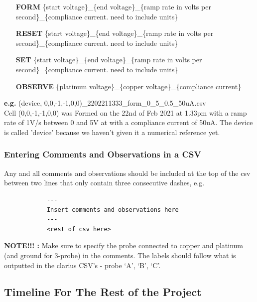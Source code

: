 \documentclass{article}
\begin{document}
          \begin{itemize}
            \item [\textbf{FORM}] \{start voltage\}\_\{end voltage\}\_\{ramp rate in volts per second\}\_\{compliance
              current. need to include units\}
            \item [\textbf{RESET}] \{start voltage\}\_\{end voltage\}\_\{ramp rate in volts per second\}\_\{compliance
              current. need to include units\}
            \item [\textbf{SET}] \{start voltage\}\_\{end voltage\}\_\{ramp rate in volts per second\}\_\{compliance
              current. need to include units\}
            \item [\textbf{OBSERVE}] \{platinum voltage\}\_\{copper voltage\}\_\{compliance current\}
          \end{itemize}

          \textbf{e.g.} (device, 0,0,-1,-1,0,0)\_2202211333\_form\_0\_5\_0.5\_50uA.csv \\ Cell (0,0,-1,-1,0,0) was
          Formed on the 22nd of Feb 2021 at 1.33pm with a ramp rate of 1V/s between 0 and 5V at with a compliance
          current of 50uA. The device is called 'device' because we haven't given it a numerical reference yet.

        \subsubsection{Entering Comments and Observations in a CSV} \label{comments}

          Any and all comments and observations should be included at the top of the csv between two lines that only
          contain three consecutive dashes, e.g. 
          \begin{verbatim} 
            ---
            Insert comments and observations here 
            --- 
            <rest of csv here>
          \end{verbatim}

          \textbf{NOTE!!! :} Make sure to specify the probe connected to copper and platinum (and ground for 3-probe)
          in the comments. The labels should follow what is outputted in the clarius CSV's - probe `A', `B', `C'.

      \subsection{Timeline For The Rest of the Project}
\end{document}
